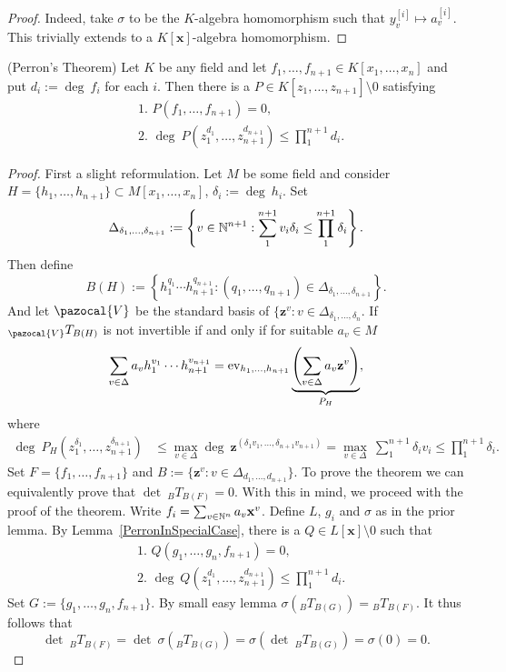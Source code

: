    \begin{proof}
        Indeed, take $\sigma$ to be the $K$-algebra homomorphism such that $y_v^{[i]}\mapsto a_v^{[i]}$. This trivially extends to a $K[\mathbf{x}]$-algebra homomorphism. 
    \end{proof}
    \begin{theorem}(Perron's Theorem) Let $K$ be any field and let $f_1,\dots,f_{n+1}\in K[x_1,\dots,x_{n}]$ and put $d_i := \deg \ f_i$ for each $i$. Then there is a $P\in K[z_1,\dots,z_{n+1}]\setminus 0$ satisfying 
    \begin{align*}
        &\text{1. } P(f_1,\dots,f_{n+1}) = 0,\\
        &\text{2. } \deg \ P(z_1^{d_1},\dots,z_{n+1}^{d_{n+1}}) \leq \prod_1^{n+1} d_i.
    \end{align*}
    \end{theorem}
    \begin{proof}
        First a slight reformulation. Let $M$ be some field and consider $H=\{h_1,\dots,h_{n+1}\} \subset M[x_1,\dots,x_n]$, $\delta_i:=\deg\ h_i$. Set $$\Delta_{\delta_1,\dots,\delta_{n+1}}:=\left\{ v\in \mathbb{N}^{n+1} : \sum_1^{n+1} v_i\delta_i \leq \prod_1^{n+1} \delta_i\right\}.$$
        Then define 
        $$B(H) := \left\{ h_1^{q_1}\cdots h_{n+1}^{q_{n+1}} : (q_1,\dots,q_{n+1})\in \Delta_{\delta_1,\dots,\delta_{n+1}}\right\}.$$
        And let $\pazocal{V}$ be the standard basis of $\{\mathbf{z}^v : v\in \Delta_{\delta_1,\dots,\delta_n}$. If $_\pazocal{V}T_{B(H)}$ is not invertible if and only if for suitable $a_v\in M$
        $$\sum_{v\in \Delta } a_vh_1^{v_1}\cdots h_{n+1}^{v_{n+1}} = \mathrm{ev}_{h_1,\dots,h_{n+1}}\underbrace{\left(\sum_{v\in\Delta} a_v\mathbf{z}^v\right)}_{P_H},$$
        where 
        \begin{align*}
        \deg \ P_H(z_1^{\delta_1},\dots,z_{n+1}^{\delta_{n+1}}) &\leq \max_{v\in \Delta} \deg \ \mathbf{z}^{(\delta_1v_1,\dots,\delta_{n+1}v_{n+1})} = \max_{v\in\Delta}\ \sum_1^{n+1} \delta_iv_i \leq \prod_1^{n+1}\delta_i.
        \end{align*}
        Set $F=\{f_1,\dots,f_{n+1}\}$ and $B := \{\mathbf{z}^v : v\in \Delta_{d_1,\dots,d_{n+1}}\}$. To prove the theorem we can equivalently prove that $\det \ _BT_{B(F)}=0$. With this in mind, we proceed with the proof of the theorem. Write $f_i = \sum_{v\in\mathbb{N}^n} a_v\mathbf{x}^v$. Define $L$, $g_i$ and $\sigma$ as in the prior lemma. By Lemma~\ref{PerronInSpecialCase}, there is a $Q\in L[\mathbf{x}]\setminus 0$ such that 
        \begin{align*}
            &\text{1. } Q(g_1,\dots,g_n,f_{n+1}) =0,\\
            &\text{2. } \deg \ Q(z_1^{d_1},\dots,z_{n+1}^{d_{n+1}}) \leq \prod_1^{n+1} d_i.
        \end{align*}
        Set $G := \{g_1,\dots,g_n,f_{n+1}\}$. By {\Large small easy lemma} $\sigma(_BT_{B(G)}) = {_B}T_{B(F)}$. It thus follows that 
        $$\det \ {_B}T_{B(F)} = \det \ \sigma(_BT_{B(G)}) = \sigma(\det\ _BT_{B(G)})= \sigma(0)=0.$$ 
    \end{proof}
